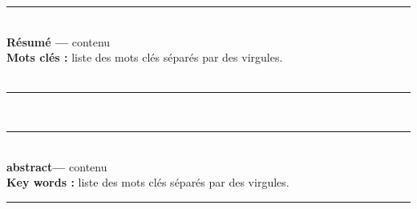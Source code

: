 \thispagestyle{empty}

\noindent\rule[2pt]{\textwidth}{0.5pt}\\
{\textbf{Résumé ---}}
contenu\\
{\textbf{Mots clés :}}
liste des mots clés séparés par des virgules.
\\


\\
\noindent\rule[2pt]{\textwidth}{0.5pt}\\[2cm]
\noindent\rule[2pt]{\textwidth}{0.5pt}\\
{\textbf{abstract---}}
contenu\\
{\textbf{Key words :}}
liste des mots clés séparés par des virgules.
\\
\noindent\rule[2pt]{\textwidth}{0.5pt} 